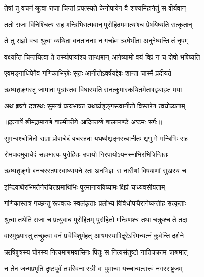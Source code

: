 \twolineshloka
{तेषां तु वचनं श्रुत्वा राजा चिन्तां प्रपत्स्यते}
{केनोपायेन वै शक्यमिहानेतुं स वीर्यवान्} %

\twolineshloka
{ततो राजा विनिश्चित्य सह मन्त्रिभिरात्मवान्}
{पुरोहितममात्यांश्च प्रेषयिष्यति सत्कृतान्} %

\twolineshloka
{ते तु राज्ञो वचः श्रुत्वा व्यथिता वनताननाः}
{न गच्छेम ऋषेर्भीता अनुनेष्यन्ति तं नृपम्} %

\twolineshloka
{वक्ष्यन्ति चिन्तयित्वा ते तस्योपायांश्च तान्क्षमान्}
{आनेष्यामो वयं विप्रं न च दोषो भविष्यति} %

\twolineshloka
{एवमङ्गाधिपेनैव गणिकाभिरृषेः सुतः}
{आनीतोऽवर्षयद्देवः शान्ता चास्मै प्रदीयते} %

\twolineshloka
{ऋष्यशृङ्गस्तु जामाता पुत्रांस्तव विधास्यति}
{सनत्कुमारकथितमेतावद्व्याहृतं मया} %

\twolineshloka
{अथ हृष्टो दशरथः सुमन्त्रं प्रत्यभाषत}
{यथर्ष्यशृङ्गस्त्वानीतो विस्तरेण त्वयोच्यताम्} %


{॥इत्यार्षे श्रीमद्रामायणे वाल्मीकीये आदिकाव्ये बालकाण्डे अष्टमः सर्गः॥}


\twolineshloka
{सुमन्त्रश्चोदितो राज्ञा प्रोवाचेदं वचस्तदा}
{यथर्ष्यशृङ्गस्त्वानीतः शृणु मे मन्त्रिभिः सह} %

\twolineshloka
{रोमपादमुवाचेदं सहामात्यः पुरोहितः}
{उपायो निरपायोऽयमस्माभिरभिचिन्तितः} %

\twolineshloka
{ऋष्यशृङ्गो वनचरस्तपःस्वाध्यायने रतः}
{अनभिज्ञः स नारीणां विषयाणां सुखस्य च} %

\twolineshloka
{इन्द्रियार्थैरभिमतैर्नरचित्तप्रमाथिभिः}
{पुरमानाययिष्यामः क्षिप्रं चाध्यवसीयताम्} %

\twolineshloka
{गणिकास्तत्र गच्छन्तु रूपवत्यः स्वलंकृताः}
{प्रलोभ्य विविधोपायैरानेष्यन्तीह सत्कृताः} %

\twolineshloka
{श्रुत्वा तथेति राजा च प्रत्युवाच पुरोहितम्}
{पुरोहितो मन्त्रिणश्च तथा चक्रुश्च ते तदा} %

\twolineshloka
{वारमुख्यास्तु तच्छ्रुत्वा वनं प्रविविशुर्महत्}
{आश्रमस्याविदूरेऽस्मिन्यत्नं कुर्वन्ति दर्शने} %

\twolineshloka
{ऋषिपुत्रस्य घोरस्य नित्यमाश्रमवासिनः}
{पितुः स नित्यसंतुष्टो नातिचक्राम चाश्रमात्} %

\twolineshloka
{न तेन जन्मप्रभृति दृष्टपूर्वं तपस्विना}
{स्त्री वा पुमान्वा यच्चान्यत्सत्त्वं नगरराष्ट्रजम्} %

